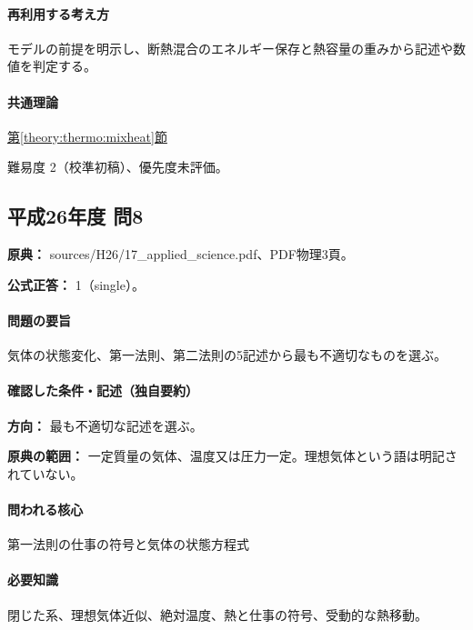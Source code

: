 \paragraph{再利用する考え方} モデルの前提を明示し、断熱混合のエネルギー保存と熱容量の重みから記述や数値を判定する。

\paragraph{共通理論} \hyperref[theory:thermo:mixheat]{第\ref*{theory:thermo:mixheat}節}

\par 難易度 2（校準初稿）、優先度未評価。

\subsection{平成26年度 問8}
\label{q:h26-reg-applied-08}

\noindent\textbf{原典：} sources/H26/17\_applied\_science.pdf、PDF物理3頁。

\textbf{公式正答：} 1（single）。

\paragraph{問題の要旨} 気体の状態変化、第一法則、第二法則の5記述から最も不適切なものを選ぶ。

\paragraph{確認した条件・記述（独自要約）}\mbox{}\par

\noindent\textbf{方向：} 最も不適切な記述を選ぶ。\par

\noindent\textbf{原典の範囲：} 一定質量の気体、温度又は圧力一定。理想気体という語は明記されていない。\par

\paragraph{問われる核心} 第一法則の仕事の符号と気体の状態方程式

\paragraph{必要知識} 閉じた系、理想気体近似、絶対温度、熱と仕事の符号、受動的な熱移動。

